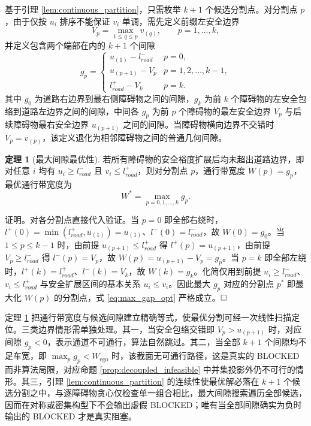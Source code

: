 \documentclass[a4paper,11pt]{ctexart}
\theoremstyle{definition}
\newtheorem{theorem}{定理}[section]
\begin{document}
基于引理 \ref{lem:continuous_partition}，只需枚举 $k+1$ 个候选分割点。对分割点 $p$，由于仅按 $u_i$ 排序不能保证 $v_i$ 单调，需先定义前缀左安全边界
\begin{equation}
    V_p = \max_{1 \leq q \leq p} v_{(q)}, \qquad p = 1, \ldots, k,
    \label{eq:prefix_v}
\end{equation}
并定义包含两个端部在内的 $k+1$ 个间隙
\begin{equation}
    g_p = \begin{cases}
        u_{(1)} - l_{road}^{-} & p = 0, \\[0.3em]
        u_{(p+1)} - V_p & p = 1, 2, \ldots, k-1, \\[0.3em]
        l_{road}^{+} - V_k & p = k.
    \end{cases}
    \label{eq:gap_def}
\end{equation}
其中 $g_0$ 为道路右边界到最右侧障碍物之间的间隙，$g_k$ 为前 $k$ 个障碍物的左安全包络到道路左边界之间的间隙，中间各 $g_p$ 为前 $p$ 个障碍物的最左安全边界 $V_p$ 与后续障碍物最右安全边界 $u_{(p+1)}$ 之间的间隙。当障碍物横向边界不交错时 $V_p = v_{(p)}$，该定义退化为相邻障碍物之间的普通几何间隙。

\begin{theorem}[最大间隙最优性]
\label{thm:max_gap}
若所有障碍物的安全裕度扩展后均未超出道路边界，即对任意 $i$ 均有 $u_i \geq l_{road}^{-}$ 且 $v_i \leq l_{road}^{+}$，则对分割点 $p$，通行带宽度 $W(p) = g_p$，最优通行带宽度为
\begin{equation}
    W^{*} = \max_{p = 0, 1, \ldots, k} g_p.
    \label{eq:max_gap_opt}
\end{equation}
\end{theorem}

证明。对各分割点直接代入验证。当 $p = 0$ 即全部右绕时，$l^{+}(0) = \min(l_{road}^{+}, u_{(1)}) = u_{(1)}$、$l^{-}(0) = l_{road}^{-}$，故 $W(0) = g_0$。当 $1 \leq p \leq k-1$ 时，由前提 $u_{(p+1)} \leq l_{road}^{+}$ 得 $l^{+}(p) = u_{(p+1)}$，由前提 $V_p \geq l_{road}^{-}$ 得 $l^{-}(p) = V_p$，故 $W(p) = u_{(p+1)} - V_p = g_p$。当 $p = k$ 即全部左绕时，$l^{+}(k) = l_{road}^{+}$、$l^{-}(k) = V_k$，故 $W(k) = g_k$。化简仅用到前提 $u_i \geq l_{road}^{-}$、$v_i \leq l_{road}^{+}$ 与安全扩展区间的基本关系 $u_i \leq v_i$。因此最大 $g_p$ 对应的分割点 $p^{*}$ 即最大化 $W(p)$ 的分割点，式 \eqref{eq:max_gap_opt} 严格成立。$\hfill\Box$

定理 \ref{thm:max_gap} 把通行带宽度与候选间隙建立精确等式，使最优分割可经一次线性扫描定位。三类边界情形需单独处理。其一，当安全包络交错即 $V_p > u_{(p+1)}$ 时，对应间隙 $g_p < 0$，表示通道不可通行，算法自然跳过。其二，当全部 $k+1$ 个间隙均不足车宽，即 $\max_p g_p < W_{\text{ego}}$ 时，该截面无可通行路径，这是真实的 BLOCKED 而非算法局限，对应命题 \ref{prop:decoupled_infeasible} 中并集投影外仍不可行的情形。其三，引理 \ref{lem:continuous_partition} 的连续性使最优解必落在 $k+1$ 个候选分割之中，与逐障碍物贪心仅检查单一组合相比，最大间隙搜索遍历全部候选，因而在对称或密集构型下不会输出虚假 BLOCKED；唯有当全部间隙确实为负时输出的 BLOCKED 才是真实阻塞。
\end{document}
